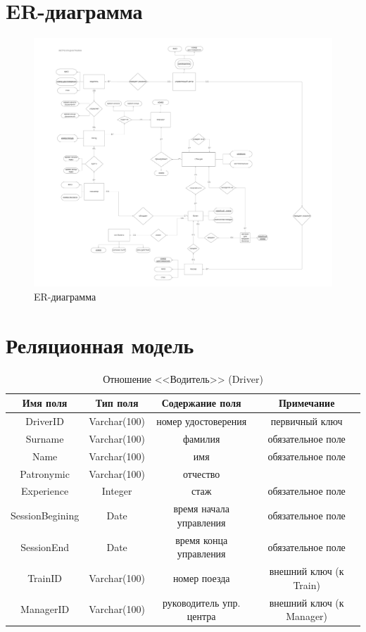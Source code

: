 \documentclass[a4paper,10pt]{article}
\theoremstyle{plain} %
\theoremstyle{definition} %
\theoremstyle{remark} %
\theoremstyle{definition}
\begin{document}
\newpage
\section{ER-диаграмма}
\begin{figure}[!h]
    \centering
    \includegraphics[width=1.15\textwidth]{Metro_model.pdf}
    \caption{ER-диаграмма}
    \label{fig:my_label}
\end{figure}
\newpage
\section{Реляционная модель}
\begin{table}[h!]
\centering
\begin{tabular}{|c|c|c|c|}
    \hline
    Имя поля & Тип поля & Содержание поля & Примечание \\
    \hline
    DriverID & Varchar(100) & номер удостоверения & первичный ключ \\
    Surname & Varchar(100) & фамилия & обязательное поле \\
    Name & Varchar(100) & имя & обязательное поле \\
    Patronymic & Varchar(100) & отчество & \\
    Experience & Integer & стаж & обязательное поле\\
    SessionBegining & Date & время начала управления & обязательное поле \\
    SessionEnd & Date & время конца управления & обязательное поле\\
    TrainID & Varchar(100) & номер поезда & внешний ключ (к Train)\\
    ManagerID & Varchar(100) & руководитель упр. центра & внешний ключ (к Manager) \\
    \hline
\end{tabular}
    \caption{Отношение <<Водитель>> (Driver)}
\end{table}
\end{document}
